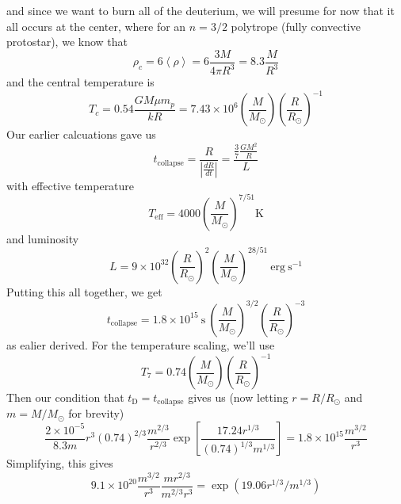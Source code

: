 \documentclass[10pt]{article}
\numberwithin{equation}{section}
\newcommand{\avg}[1]{\left\langle#1\right\rangle}
\newcommand{\abs}[1]{\left\vert#1\right\vert}
\begin{document}
  and since we want to burn all of the deuterium, we will presume for
  now that it all occurs at the center, where for an $n=3/2$ polytrope
  (fully convective protostar), we know that
  \begin{equation}
    \label{eq:340}
    \rho_c=6\avg{\rho}=6\frac{3M}{4\pi R^3}=8.3\frac{M}{R^3}
  \end{equation}
  and the central temperature is
  \begin{equation}
    \label{eq:385}
    T_c=0.54\frac{GM\mu m_p}{k R}=7.43\times 10^6\left(\frac{M}{M_\odot}\right)\left(\frac{R}{R_\odot}\right)^{-1}
  \end{equation}
  Our earlier calcuations gave us
  \begin{equation}
    \label{eq:386}
    t_{\mathrm{collapse}}=\frac{R}{\abs{\frac{dR}{dt}}}=\frac{\frac{3}{7}\frac{GM^2}{R}}{L}
  \end{equation}
  with effective temperature
  \begin{equation}
    \label{eq:387}
    T_{\mathrm{eff}}=4000 \left(\frac{M}{M_\odot}\right)^{7/51}\mathrm{K}
  \end{equation}
  and luminosity
  \begin{equation}
    \label{eq:388}
    L=9\times
    10^{32}\left(\frac{R}{R_\odot}\right)^2\left(\frac{M}{M_\odot}\right)^{28/51}\
    \mathrm{erg\ s^{-1}}
  \end{equation}
  Putting this all together, we get
  \begin{equation}
    \label{eq:389}
    \boxed{t_{\mathrm{collapse}}=1.8\times 10^{15}\ \mathrm{s}\
    \left(\frac{M}{M_\odot}\right)^{3/2}\left(\frac{R}{R_\odot}\right)^{-3}}
  \end{equation}
  as ealier derived. For the temperature scaling, we'll use
  \begin{equation}
    \label{eq:390}
    T_7=0.74\left(\frac{M}{M_\odot}\right)\left(\frac{R}{R_\odot}\right)^{-1}
  \end{equation}
  Then our condition that $t_\mathrm{D}=t_{\mathrm{collapse}}$ gives
  us (now letting $r=R/R_\odot$ and $m=M/M_\odot$ for brevity)
  \begin{equation}
    \label{eq:391}
    \frac{2\times 10^{-5}}{8.3
      m}r^3\left(0.74\right)^{2/3}\frac{m^{2/3}}{r^{2/3}}\exp\left[\frac{17.24
        r^{1/3}}{(0.74)^{1/3}m^{1/3}}\right]=1.8\times 10^{15}\frac{m^{3/2}}{r^3}
  \end{equation}
  Simplifying, this gives
  \begin{equation}
    \label{eq:392}
    9.1\times
    10^{20}\frac{m^{3/2}}{r^3}\frac{mr^{2/3}}{m^{2/3}r^3}=\exp\left(19.06 r^{1/3}/m^{1/3}\right)
  \end{equation}
\end{document}
